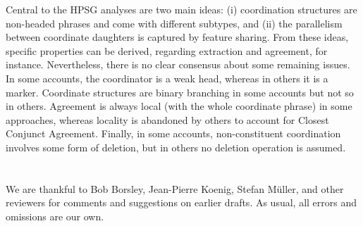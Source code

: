 Central to the HPSG analyses are two main ideas: (i) coordination structures are non-headed phrases
and come with different subtypes, and (ii) the parallelism between coordinate daughters is captured
by feature sharing. From these ideas, specific properties can be derived, regarding extraction and
agreement, for instance. Nevertheless, there is no clear consensus about some remaining issues. In
some accounts, the coordinator is a weak head, whereas in others it is a marker. Coordinate
structures are binary branching in some accounts but not so in others. Agreement is always local
(with the whole coordinate phrase) in some approaches, whereas locality is abandoned by others
to account for Closest Conjunct Agreement. Finally, in some accounts, non-constituent coordination
involves some form of deletion, but in others no deletion operation is assumed.

 
%


\section*{\acknowledgmentsUS}

We are thankful to Bob Borsley, Jean-Pierre Koenig, Stefan Müller, and other reviewers for comments and suggestions on earlier drafts. 
As usual, all errors and omissions are our own.


{\sloppy
\printbibliography[heading=subbibliography,notkeyword=this] 
}



